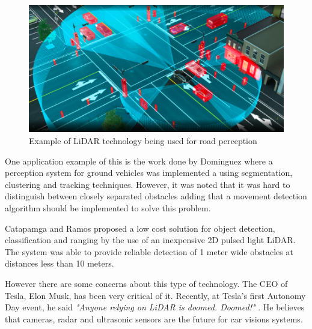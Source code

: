 \begin{figure}[ht] 
\centerline{\includegraphics [width=0.7 \textwidth]{imgs/chapter2/lidarcar.png}}
\caption[Example of \ac{LiDAR} technology being used for road perception]{Example of \ac{LiDAR} technology being used for road perception \cite{lidarcar}}
\label{fig:lidarcar}
\end{figure}

One application example of this is the work done by Dominguez \cite{lidarperception}  where a perception system for ground vehicles was implemented a  using segmentation, clustering and tracking techniques.  However, it was noted that it was hard to distinguish between closely separated obstacles adding that a movement detection algorithm should be implemented to solve this problem. 


Catapamga and Ramos \cite{car2dlidar} proposed  a low cost solution for object detection, classification and ranging by the use of an inexpensive 2D pulsed light \ac{LiDAR}. The system was able to provide reliable detection of 1 meter wide obstacles at distances less than 10 meters.


However there are some concerns about this type of technology. The CEO of Tesla, Elon Musk, has been very critical of it. Recently, at Tesla’s first Autonomy Day event,  he said \textit{"Anyone relying on \ac{LiDAR} is doomed. Doomed!"} \cite{elon}. He believes that cameras, \ac{radar} and ultrasonic sensors are the future for car visions systems. 
